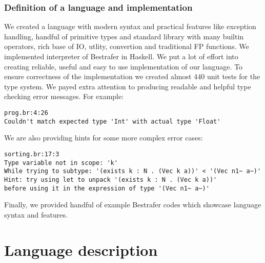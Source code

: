 \documentclass[declaration,shortabstract,english]{iithesis}
\begin{document}
\subsection*{Definition of a language and implementation}
We created a language with modern syntax and practical features like exception handling, handful of primitive types
and standard library with many builtin operators, rich base of IO, utlity, convertion and traditional FP functions.
We implemented interpreter of Bestrafer in Haskell. We put a lot of effort into
creating reliable, useful and easy to use implementation of our language.
To ensure correctness of the implementation we created almost 440 unit tests for the type system.
We payed extra attention to producing readable and helpful type checking error messages.
For example:
\begin{verbatim}
prog.br:4:26
Couldn't match expected type 'Int' with actual type 'Float'
\end{verbatim}
We are also providing hints for some more complex error cases:
\begin{verbatim}
sorting.br:17:3
Type variable not in scope: 'k'
While trying to subtype: '(exists k : N . (Vec k a))' < '(Vec n1~ a~)'
Hint: try using let to unpack '(exists k : N . (Vec k a))'
before using it in the expression of type '(Vec n1~ a~)'
\end{verbatim}
Finally, we provided handful of example Bestrafer codes which showcase language syntax and features.
\chapter{Language description}
\end{document}
